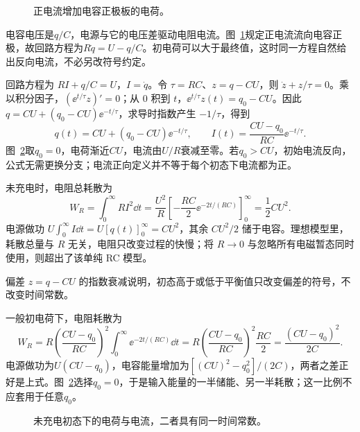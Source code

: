 \begin{figure}[H]\centering
{}
\caption{正电流增加电容正极板的电荷。}\label{fig:c2-h4-q}
\end{figure}
\begin{solution}
电容电压是$q/C$，电源与它的电压差驱动电阻电流。图~\ref{fig:c2-h4-q}规定正电流流向电容正极，故回路方程为$R\dot q=U-q/C$。初电荷可以大于最终值，这时同一方程自然给出反向电流，不必另改符号约定。


回路方程为 $RI+q/C=U$，$I=\dot q$。令 $\tau=RC$、$z=q-CU$，则 $\dot z+z/\tau=0$。乘以积分因子，$(\ee^{t/\tau}z)'=0$；从 $0$ 积到 $t$，$\ee^{t/\tau}z(t)=q_0-CU$。因此 $q=CU+(q_0-CU)\ee^{-t/\tau}$，求导时指数产生 $-1/\tau$，得到
\[\boxed{q(t)=CU+(q_0-CU)\ee^{-t/\tau},\qquad
I(t)=\frac{CU-q_0}{RC}\ee^{-t/\tau}}.
\]
图~\ref{fig:c2-h4-s}取$q_0=0$，电荷渐近$CU$，电流由$U/R$衰减至零。若$q_0>CU$，初始电流反向，公式无需更换分支；电流正向定义并不等于每个初态下电流都为正。

未充电时，电阻总耗散为
\[W_R=\int_0^\infty RI^2\dd t
=\frac{U^2}{R}\left[-\frac{RC}{2}\ee^{-2t/(RC)}\right]_0^\infty
=\boxed{\frac12CU^2}.
\]
电源做功 $U\int_0^\infty I\dd t=U[q(t)]_0^\infty=CU^2$，其余 $CU^2/2$ 储于电容。理想模型里，耗散总量与 $R$ 无关，电阻只改变过程的快慢；将 $R\to0$ 与忽略所有电磁暂态同时使用，则超出了该单纯 RC 模型。


偏差 $z=q-CU$ 的指数衰减说明，初态高于或低于平衡值只改变偏差的符号，不改变时间常数。

一般初电荷下，电阻耗散为
\[W_R=R\left(\frac{CU-q_0}{RC}\right)^2\int_0^\infty\ee^{-2t/(RC)}\dd t
=R\left(\frac{CU-q_0}{RC}\right)^2\frac{RC}{2}
=\frac{(CU-q_0)^2}{2C}.\]
电源做功为$U(CU-q_0)$，电容能量增加为$[(CU)^2-q_0^2]/(2C)$，两者之差正好是上式。图~\ref{fig:c2-h4-s}选择$q_0=0$，于是输入能量的一半储能、另一半耗散；这一比例不应套用于任意$q_0$。

\begin{figure}[H]\centering
{}
\caption{未充电初态下的电荷与电流，二者具有同一时间常数。}\label{fig:c2-h4-s}
\end{figure}
\end{solution}

